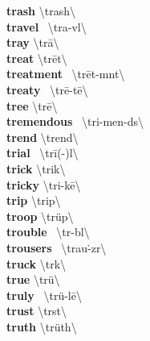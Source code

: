 \documentclass[10pt,a4paper]{article}
\begin{document}
\begin{multicols}{2}
\textbf{ trash }\quad \textbackslash \textprimstress trash\textbackslash \\
\textbf{ travel }\quad \ \textbackslash \textprimstress tra-v\textschwa l\textbackslash \\
\textbf{ tray }\quad \textbackslash \textprimstress tr\={a}\textbackslash \\
\textbf{ treat }\quad \textbackslash \textprimstress tr\={e}t\textbackslash \\
\textbf{ treatment }\quad \ \textbackslash \textprimstress tr\={e}t-m\textschwa nt\textbackslash \\
\textbf{ treaty }\quad \ \textbackslash \textprimstress tr\={e}-t\={e}\textbackslash \\
\textbf{ tree }\quad \textbackslash \textprimstress tr\={e}\textbackslash \\
\textbf{ tremendous }\quad \ \textbackslash tri-\textprimstress men-d\textschwa s\textbackslash \\
\textbf{ trend }\quad \textbackslash \textprimstress trend\textbackslash \\
\textbf{ trial }\quad \ \textbackslash \textprimstress tr\={i}(-\textschwa )l\textbackslash \\
\textbf{ trick }\quad \textbackslash \textprimstress trik\textbackslash \\
\textbf{ tricky }\quad \textbackslash \textprimstress tri-k\={e}\textbackslash \\
\textbf{ trip }\quad \textbackslash \textprimstress trip\textbackslash \\
\textbf{ troop }\quad \textbackslash \textprimstress tr\"{u}p\textbackslash \\
\textbf{ trouble }\quad \ \textbackslash \textprimstress tr\textschwa -b\textschwa l\textbackslash \\
\textbf{ trousers }\quad \ \textbackslash \textprimstress trau\. -z\textschwa r\textbackslash \\
\textbf{ truck }\quad \textbackslash \textprimstress tr\textschwa k\textbackslash \\
\textbf{ true }\quad \textbackslash \textprimstress tr\"{u}\textbackslash \\
\textbf{ truly }\quad \ \textbackslash \textprimstress tr\"{u}-l\={e}\textbackslash \\
\textbf{ trust }\quad \textbackslash \textprimstress tr\textschwa st\textbackslash \\
\textbf{ truth }\quad \textbackslash \textprimstress tr\"{u}th\textbackslash \\

\end{multicols}
\end{document}
